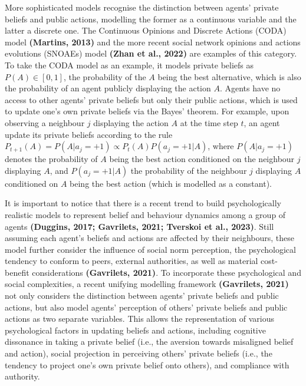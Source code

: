 \documentclass[
  11pt,
]{article}
\begin{document}
More sophisticated models recognise the distinction between agents'
private beliefs and public actions, modelling the former as a continuous
variable and the latter a discrete one. The Continuous Opinions and
Discrete Actions (CODA) model \textbf{(Martins, 2013)} and the more
recent social network opinions and actions evolutions (SNOAEs) model
\textbf{(Zhan et al., 2022)} are examples of this category. To take the
CODA model as an example, it models private beliefs as
\(P(A) \in [0,1]\), the probability of the \(A\) being the best
alternative, which is also the probability of an agent publicly
displaying the action \(A\). Agents have no access to other agents'
private beliefs but only their public actions, which is used to update
one's own private beliefs via the Bayes' theorem. For example, upon
observing a neighbour \(j\) displaying the action \(A\) at the time step
\(t\), an agent update its private beliefs according to the rule
\(P_{t+1}(A) = P(A | a_j = +1) \propto P_t(A) P(a_j = +1 | A)\), where
\(P(A | a_j = +1)\) denotes the probability of \(A\) being the best
action conditioned on the neighbour \(j\) displaying \(A\), and
\(P(a_j = +1 | A)\) the probability of the neighbour \(j\) displaying
\(A\) conditioned on \(A\) being the best action (which is modelled as a
constant).

It is important to notice that there is a recent trend to build
psychologically realistic models to represent belief and behaviour
dynamics among a group of agents \textbf{(Duggins, 2017; Gavrilets,
2021; Tverskoi et al., 2023)}. Still assuming each agent's beliefs and
actions are affected by their neighbours, these model further consider
the influence of social norm perception, the psychological tendency to
conform to peers, external authorities, as well as material cost-benefit
considerations \textbf{(Gavrilets, 2021)}. To incorporate these
psychological and social complexities, a recent unifying modelling
framework \textbf{(Gavrilets, 2021)} not only considers the distinction
between agents' private beliefs and public actions, but also model
agents' perception of others' private beliefs and public actions as two
separate variables. This allows the representation of various
psychological factors in updating beliefs and actions, including
cognitive dissonance in taking a private belief (i.e., the aversion
towards misaligned belief and action), social projection in perceiving
others' private beliefs (i.e., the tendency to project one's own private
belief onto others), and compliance with authority.
\end{document}
